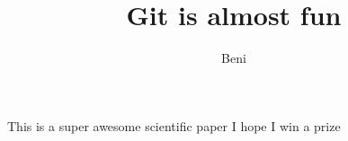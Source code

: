 \documentclass[10p]{article}
\author{Beni}
\title{Git is almost fun}
\begin{document}
      \maketitle
      This is a super awesome scientific paper
      I hope I win a prize
\end{document}
